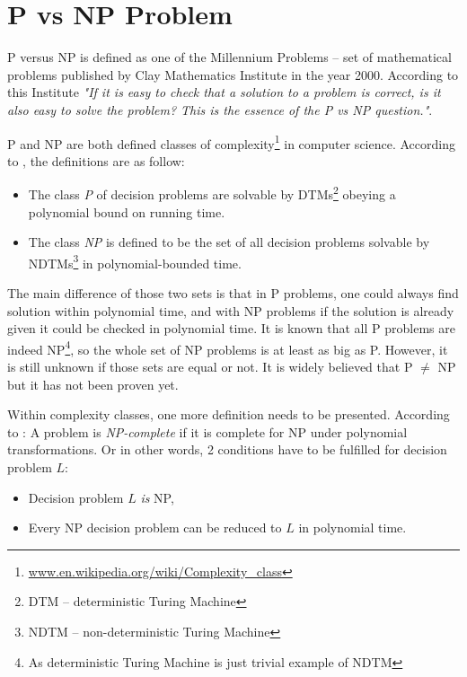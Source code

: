 \documentclass[12pt,english,pdflatex]{aghdpl}
\begin{document}
\section{P vs NP Problem}
\label{sec:PvsNP}

P versus NP is defined as one of the Millennium Problems -- set of mathematical problems published by 
Clay Mathematics Institute in the year 2000. According to this Institute \textit{"If it is easy to check that a solution to a problem is correct, is it also easy to solve the problem? This is the essence of the P vs NP question."}\cite{Millennium}.

P and NP are both defined classes of complexity\footnote{\url{www.en.wikipedia.org/wiki/Complexity_class}} in computer science. According to \cite{vanLeeuwen:1991}, the definitions are as follow:
\begin{itemize}
\item The class \textit{P} of decision problems are solvable by DTMs\footnote{DTM -- deterministic Turing Machine}
 obeying a polynomial bound on running time.
\item The class \textit{NP} is defined to be the set of all decision problems solvable by
NDTMs\footnote{NDTM -- non-deterministic Turing Machine} in polynomial-bounded time.
\end{itemize}

The main difference of those two sets is that in P problems, one could
always find solution within polynomial time, and with NP problems
if the solution is already given it could be checked in polynomial
time. It is known that all P problems are indeed NP\footnote{As deterministic Turing Machine
is just trivial example of NDTM}, so the whole set
of NP problems is at least as big as P. However, it is still unknown
if those sets are equal or not. It is widely believed that P $\neq$ NP
but it has not been proven yet. 

\label{misc:np-complete}Within complexity classes, one more definition needs to be presented. According to \cite{vanLeeuwen:1991}: A problem is \textit{NP-complete} if it is complete for NP under polynomial transformations. Or in other words, 2 conditions have to be fulfilled for decision problem $L$:
\begin{itemize}
\item Decision problem $L$ \textit{is} NP,
\item Every NP decision problem can be reduced to $L$ in polynomial time.
\end{itemize}
\end{document}
